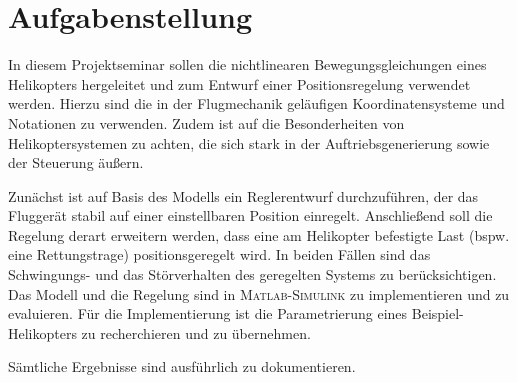 \section*{Aufgabenstellung}
In diesem Projektseminar sollen die nichtlinearen Bewegungsgleichungen eines Helikopters hergeleitet und zum Entwurf einer Positionsregelung verwendet werden. Hierzu sind die in der Flugmechanik geläufigen Koordinatensysteme und Notationen zu verwenden. Zudem ist auf die Besonderheiten von Helikoptersystemen zu achten, die sich stark in der Auftriebsgenerierung sowie der Steuerung äußern.

Zunächst ist auf Basis des Modells ein Reglerentwurf durchzuführen, der das Fluggerät stabil auf einer einstellbaren Position einregelt. Anschließend soll die Regelung derart erweitern werden, dass eine am Helikopter befestigte Last (bspw. eine Rettungstrage) positionsgeregelt wird. In beiden Fällen sind das Schwingungs- und das Störverhalten des geregelten Systems zu berücksichtigen.
Das Modell und die Regelung sind in \textsc{Matlab-Simulink} zu implementieren und zu evaluieren. Für die Implementierung ist die Parametrierung eines Beispiel-Helikopters zu recherchieren und zu übernehmen.

Sämtliche Ergebnisse sind ausführlich zu dokumentieren.

\SADAAufgabenstellung